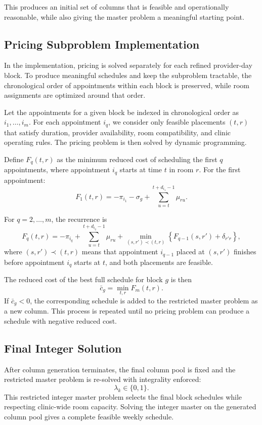 \documentclass[12pt]{article}
\begin{document}
This produces an initial set of columns that is feasible and operationally reasonable, while
also giving the master problem a meaningful starting point.

\subsection*{Pricing Subproblem Implementation}

In the implementation, pricing is solved separately for each refined provider-day block. To
produce meaningful schedules and keep the subproblem tractable, the chronological order of
appointments within each block is preserved, while room assignments are optimized around that order.

Let the appointments for a given block be indexed in chronological order as $i_1, \ldots, i_m$.
For each appointment $i_q$, we consider only feasible placements $(t, r)$ that satisfy duration,
provider availability, room compatibility, and clinic operating rules. The pricing problem is then
solved by dynamic programming.

Define $F_q(t, r)$ as the minimum reduced cost of scheduling the first $q$ appointments, where
appointment $i_q$ starts at time $t$ in room $r$. For the first appointment:
\[
  F_1(t, r) = -\pi_{i_1} - \sigma_g + \sum_{u=t}^{t+d_{i_1}-1} \mu_{ru}.
\]

For $q = 2, \ldots, m$, the recurrence is
\[
  F_q(t, r) = -\pi_{i_q} + \sum_{u=t}^{t+d_{i_q}-1} \mu_{ru}
  + \min_{(s,r') \prec (t,r)} \left\{ F_{q-1}(s, r') + \delta_{r'r} \right\},
\]
where $(s, r') \prec (t, r)$ means that appointment $i_{q-1}$ placed at $(s, r')$ finishes before
appointment $i_q$ starts at $t$, and both placements are feasible.

The reduced cost of the best full schedule for block $g$ is then
\[
  \bar{c}_g = \min_{t,r} F_m(t, r).
\]
If $\bar{c}_g < 0$, the corresponding schedule is added to the restricted master problem as a new
column. This process is repeated until no pricing problem can produce a schedule with negative
reduced cost.

\subsection*{Final Integer Solution}

After column generation terminates, the final column pool is fixed and the restricted master
problem is re-solved with integrality enforced:
\[
  \lambda_k \in \{0, 1\}.
\]
This restricted integer master problem selects the final block schedules while respecting
clinic-wide room capacity. Solving the integer master on the generated column pool gives a
complete feasible weekly schedule.
\end{document}
